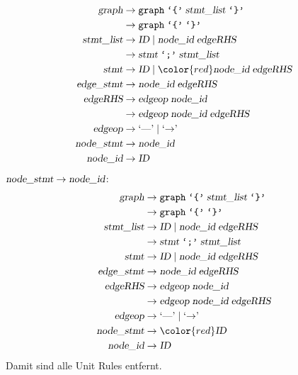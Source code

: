 \begin{loesung}
\begin{teilaufgaben}
\begin{align*}
\textsl{graph}     &\rightarrow \texttt{graph}\; \texttt{`\{'}\; \textsl{stmt\_list}\; \texttt{`\}'} \\
                   &\rightarrow \texttt{graph}\; \texttt{`\{'}\; \texttt{`\}'} \\
\textsl{stmt\_list}&\rightarrow \textsl{ID}\; |\;
                                \textsl{node\_id}\; \textsl{edgeRHS} \\
                   &\rightarrow \textsl{stmt}\; \texttt{`;'}\; \textsl{stmt\_list}\\
\textsl{stmt}      &\rightarrow \textsl{ID}\; |\;
                                {\color{red}\textsl{node\_id}\; \textsl{edgeRHS}} \\
\textsl{edge\_stmt}&\rightarrow \textsl{node\_id}\; \textsl{edgeRHS} \\
\textsl{edgeRHS}   &\rightarrow \textsl{edgeop}\; \textsl{node\_id}\\
                   &\rightarrow \textsl{edgeop}\; \textsl{node\_id}\; \textsl{edgeRHS}\\
\textsl{edgeop}    &\rightarrow \textrm{`\text{---}'}\; |\; \textrm{`$\rightarrow$'}\; \\
\textsl{node\_stmt}&\rightarrow \textsl{node\_id} \\
\textsl{node\_id}  &\rightarrow \textsl{ID}
\end{align*}
$\textsl{node\_stmt}\to\textsl{node\_id}$:
\begin{align*}
\textsl{graph}     &\rightarrow \texttt{graph}\; \texttt{`\{'}\; \textsl{stmt\_list}\; \texttt{`\}'} \\
                   &\rightarrow \texttt{graph}\; \texttt{`\{'}\; \texttt{`\}'} \\
\textsl{stmt\_list}&\rightarrow \textsl{ID}\; |\;
                                \textsl{node\_id}\; \textsl{edgeRHS} \\
                   &\rightarrow \textsl{stmt}\; \texttt{`;'}\; \textsl{stmt\_list}\\
\textsl{stmt}      &\rightarrow \textsl{ID}\; |\;
                                \textsl{node\_id}\; \textsl{edgeRHS} \\
\textsl{edge\_stmt}&\rightarrow \textsl{node\_id}\; \textsl{edgeRHS} \\
\textsl{edgeRHS}   &\rightarrow \textsl{edgeop}\; \textsl{node\_id}\\
                   &\rightarrow \textsl{edgeop}\; \textsl{node\_id}\; \textsl{edgeRHS}\\
\textsl{edgeop}    &\rightarrow \textrm{`\text{---}'}\; |\; \textrm{`$\rightarrow$'}\; \\
\textsl{node\_stmt}&\rightarrow {\color{red}\textsl{ID}} \\
\textsl{node\_id}  &\rightarrow \textsl{ID}
\end{align*}
Damit sind alle Unit Rules entfernt. 


\end{teilaufgaben}
\end{loesung}
